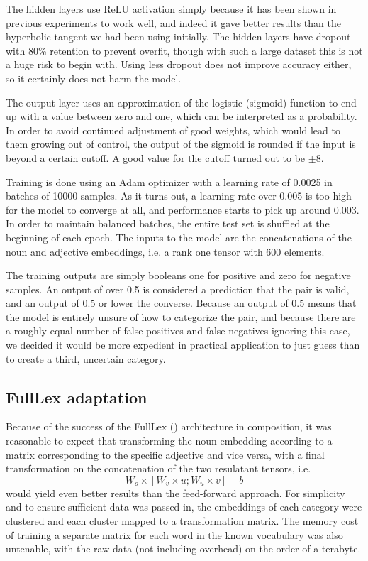 \documentclass[a4paper, 12pt]{scrartcl}
\begin{document}
The hidden layers use ReLU activation simply because it has been shown in previous experiments to work well, and indeed it gave better results than the hyperbolic tangent we had been using initially. The hidden layers have dropout with 80\% retention to prevent overfit, though with such a large dataset this is not a huge risk to begin with. Using less dropout does not improve accuracy either, so it certainly does not harm the model.

The output layer uses an approximation of the logistic (sigmoid) function to end up with a value between zero and one, which can be interpreted as a probability. In order to avoid continued adjustment of good weights, which would lead to them growing out of control, the output of the sigmoid is rounded if the input is beyond a certain cutoff. A good value for the cutoff turned out to be $ \pm 8 $.

Training is done using an Adam optimizer with a learning rate of 0.0025 in batches of 10000 samples. As it turns out, a learning rate over 0.005 is too high for the model to converge at all, and performance starts to pick up around 0.003. In order to maintain balanced batches, the entire test set is shuffled at the beginning of each epoch. The inputs to the model are the concatenations of the noun and adjective embeddings, i.e. a rank one tensor with 600 elements.

The training outputs are simply booleans \textemdash one for positive and zero for negative samples. An output of over 0.5 is considered a prediction that the pair is valid, and an output of 0.5 or lower the converse. Because an output of 0.5 means that the model is entirely unsure of how to categorize the pair, and because there are a roughly equal number of false positives and false negatives ignoring this case, we decided it would be more expedient in practical application to just guess than to create a third, uncertain category.

\subsection{FullLex adaptation}
Because of the success of the FullLex (\cite{SocherFullLex}) architecture in composition, it was reasonable to expect that transforming the noun embedding according to a matrix corresponding to the specific adjective and vice versa, with a final transformation on the concatenation of the two resulatant tensors, i.e. $$ W_o \times [W_v \times u; W_u \times v] + b $$ would yield even better results than the feed-forward approach. For simplicity and to ensure sufficient data was passed in, the embeddings of each category were clustered and each cluster mapped to a transformation matrix. The memory cost of training a separate matrix for each word in the known vocabulary was also untenable, with the raw data (not including overhead) on the order of a terabyte.
\end{document}
